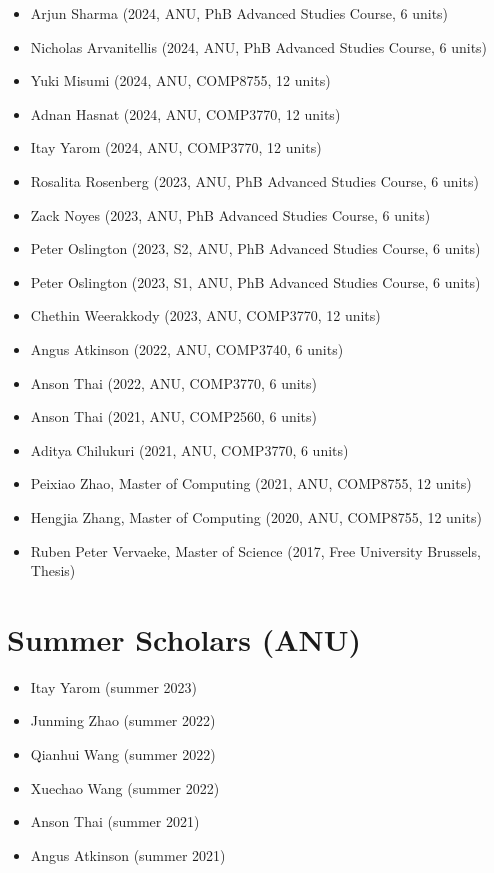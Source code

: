 \documentclass[singlecolumn,singlespace,11pt]{article}
\begin{document}
\begin{itemize}

\item Arjun Sharma (2024, ANU, PhB Advanced Studies Course, 6 units)
\item Nicholas Arvanitellis (2024, ANU, PhB Advanced Studies Course, 6 units)
\item Yuki Misumi (2024, ANU, COMP8755, 12 units)
\item Adnan Hasnat (2024, ANU, COMP3770, 12 units)
\item Itay Yarom (2024, ANU, COMP3770, 12 units)
\item Rosalita Rosenberg (2023, ANU, PhB Advanced Studies Course, 6 units)
\item Zack Noyes (2023, ANU, PhB Advanced Studies Course, 6 units)
\item Peter Oslington (2023, S2, ANU, PhB Advanced Studies Course, 6 units)
\item Peter Oslington (2023, S1, ANU, PhB Advanced Studies Course, 6 units)
\item Chethin Weerakkody (2023, ANU, COMP3770, 12 units)
\item Angus Atkinson (2022, ANU, COMP3740, 6 units)
\item Anson Thai (2022, ANU, COMP3770, 6 units)
\item Anson Thai (2021, ANU, COMP2560, 6 units)
\item Aditya Chilukuri (2021, ANU, COMP3770, 6 units)
\item Peixiao Zhao, Master of Computing (2021, ANU, COMP8755, 12 units)
\item Hengjia Zhang, Master of Computing (2020, ANU, COMP8755, 12 units) 
\item Ruben Peter Vervaeke, Master of Science (2017, Free University Brussels, Thesis)

\end{itemize}

\section*{Summer Scholars (ANU)}

\begin{itemize}

\item Itay Yarom (summer 2023)
\item Junming Zhao (summer 2022)
\item Qianhui Wang (summer 2022)
\item Xuechao Wang (summer 2022)
\item Anson Thai (summer 2021)
\item Angus Atkinson (summer 2021)

\end{itemize}
\end{document}
